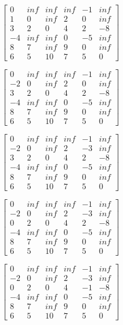 \documentclass{article}
\begin{document}
$ \begin{bmatrix}
0   & inf & inf & inf & -1 & inf      \\
1   & 0   & inf & 2  & 0  & inf \\
3   & 2   & 0   & 4  & 2  & -8  \\
-4  & inf & inf & 0  & -5 & inf \\
8   & 7   & inf & 9  & 0  & inf \\
6   & 5   & 10  & 7  & 5  & 0
\end{bmatrix}  $


$ \begin{bmatrix}
0   & inf & inf & inf & -1 & inf      \\
-2  & 0   & inf & 2  & 0  & inf \\
3   & 2   & 0   & 4  & 2  & -8  \\
-4  & inf & inf & 0  & -5 & inf \\
8   & 7   & inf & 9  & 0  & inf \\
6   & 5   & 10  & 7  & 5  & 0
\end{bmatrix}  $


$ \begin{bmatrix}
0   & inf & inf & inf & -1 & inf      \\
-2  & 0   & inf & 2  & -3 & inf \\
3   & 2   & 0   & 4  & 2  & -8  \\
-4  & inf & inf & 0  & -5 & inf \\
8   & 7   & inf & 9  & 0  & inf \\
6   & 5   & 10  & 7  & 5  & 0
\end{bmatrix}  $

$ \begin{bmatrix}
0   & inf & inf & inf & -1 & inf      \\
-2  & 0   & inf & 2  & -3 & inf \\
0   & 2   & 0   & 4  & 2  & -8  \\
-4  & inf & inf & 0  & -5 & inf \\
8   & 7   & inf & 9  & 0  & inf \\
6   & 5   & 10  & 7  & 5  & 0
\end{bmatrix}  $

$ \begin{bmatrix}
0   & inf & inf & inf & -1 & inf      \\
-2  & 0   & inf & 2  & -3 & inf \\
0   & 2   & 0   & 4  & -1 & -8  \\
-4  & inf & inf & 0  & -5 & inf \\
8   & 7   & inf & 9  & 0  & inf \\
6   & 5   & 10  & 7  & 5  & 0
\end{bmatrix}  $
\end{document}
